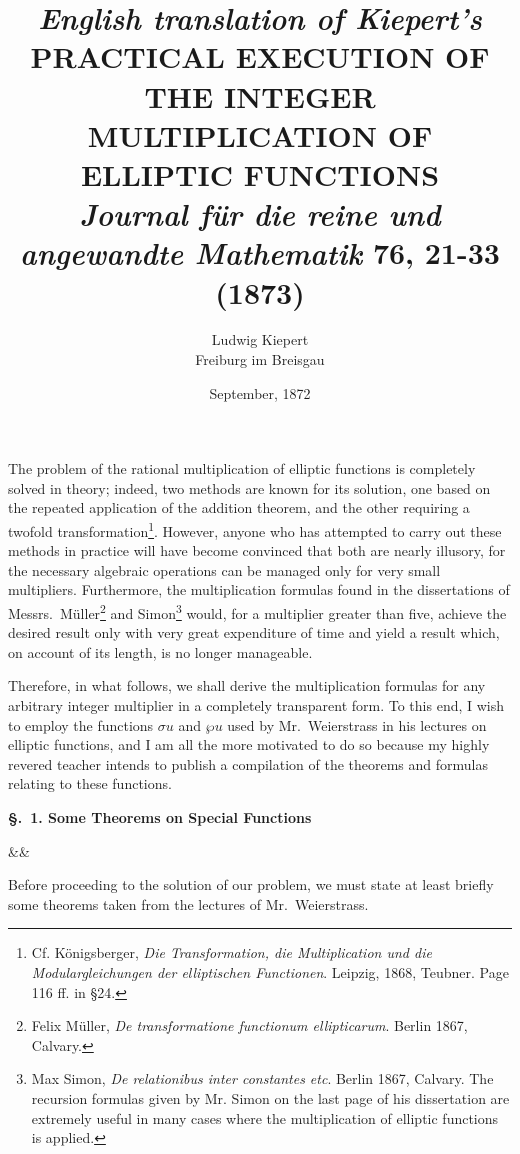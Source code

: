 \documentclass[12pt]{article}
\title{
    {\small\textit{English translation of Kiepert's}} \\[0.5em] 
    \MakeUppercase{Practical Execution of the Integer Multiplication of Elliptic Functions}
    \\[0.5em] {\small \textit{Journal für die reine und angewandte Mathematik} 76, 21-33 (1873)}
    }
\author{Ludwig Kiepert \\ Freiburg im Breisgau }
\date{September, 1872}
\newcommand{\newsection}[3][]{%
  \vspace{1.5em}%
  \begin{center}%
  \textbf{\large\S.~#2. #3}%
  \end{center}%
  \ifx&#1&\else\label{#1}\fi%
  \vspace{0.5em}%
}
\begin{document}
\maketitle

\medskip

The problem of the rational multiplication of elliptic functions is completely solved in theory; indeed, two methods are known for its solution, one based on the repeated application of the addition theorem, and the other requiring a twofold transformation\footnote{Cf. K\"onigsberger, \textit{Die Transformation, die Multiplication und die Modulargleichungen der elliptischen Functionen}. Leipzig, 1868, Teubner. Page 116 ff. in §24.}. However, anyone who has attempted to carry out these methods in practice will have become convinced that both are nearly illusory, for the necessary algebraic operations can be managed only for very small multipliers. Furthermore, the multiplication formulas found in the dissertations of Messrs.~M\"uller\footnote{Felix M\"uller, \textit{De transformatione functionum ellipticarum}. Berlin 1867, Calvary.} and Simon\footnote{Max Simon, \textit{De relationibus inter constantes etc}. Berlin 1867, Calvary. The recursion formulas given by Mr. Simon on the last page of his dissertation are extremely useful in many cases where the multiplication of elliptic functions is applied.} would, for a multiplier greater than five, achieve the desired result only with very great expenditure of time and yield a result which, on account of its length, is no longer manageable.

Therefore, in what follows, we shall derive the multiplication formulas for any arbitrary integer multiplier in a completely transparent form. To this end, I wish to employ the functions $\sigma u$ and $\wp u$ used by Mr.~Weierstrass in his lectures on elliptic functions, and I am all the more motivated to do so because my highly revered teacher intends to publish a compilation of the theorems and formulas relating to these functions.

\newsection{1}{Some Theorems on Special Functions}

Before proceeding to the solution of our problem, we must state at least briefly some theorems taken from the lectures of Mr.~Weierstrass.

\end{document}
